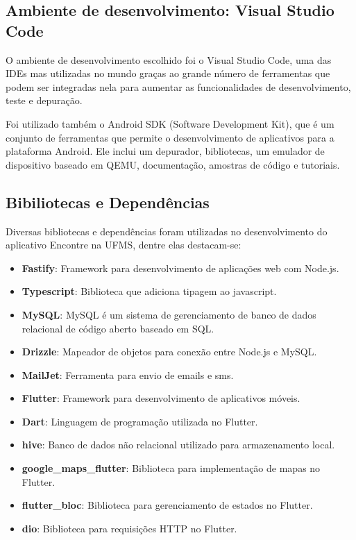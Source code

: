 \documentclass[12pt]{article}
\begin{document}
\subsection{Ambiente de desenvolvimento: Visual Studio Code}
O ambiente de desenvolvimento escolhido foi o Visual Studio Code, uma das IDEs mas utilizadas no mundo graças ao grande número de ferramentas que podem ser integradas nela para aumentar as funcionalidades de desenvolvimento, teste e depuração.

Foi utilizado também o Android SDK (Software Development Kit), que é um conjunto de ferramentas que permite o desenvolvimento de aplicativos para a plataforma Android. Ele inclui um depurador, bibliotecas, um emulador de dispositivo baseado em QEMU, documentação, amostras de código e tutoriais.

\subsection{Bibiliotecas e Dependências}
Diversas bibliotecas e dependências foram utilizadas no desenvolvimento do aplicativo Encontre na UFMS, dentre elas destacam-se:

\begin{itemize}
  \item \textbf{Fastify}: Framework para desenvolvimento de aplicações web com Node.js.
  \item \textbf{Typescript}: Biblioteca que adiciona tipagem ao javascript.
  \item \textbf{MySQL}: MySQL é um sistema de gerenciamento de banco de dados relacional de código aberto baseado em SQL.
  \item \textbf{Drizzle}: Mapeador de objetos para conexão entre Node.js e MySQL.
  \item \textbf{MailJet}: Ferramenta para envio de emails e sms.
  \item \textbf{Flutter}: Framework para desenvolvimento de aplicativos móveis.
  \item \textbf{Dart}: Linguagem de programação utilizada no Flutter.
  \item \textbf{hive}: Banco de dados não relacional utilizado para armazenamento local.
  \item \textbf{google\_maps\_flutter}: Biblioteca para implementação de mapas no Flutter.
  \item \textbf{flutter\_bloc}: Biblioteca para gerenciamento de estados no Flutter.
  \item \textbf{dio}: Biblioteca para requisições HTTP no Flutter.
\end{itemize}
\end{document}
